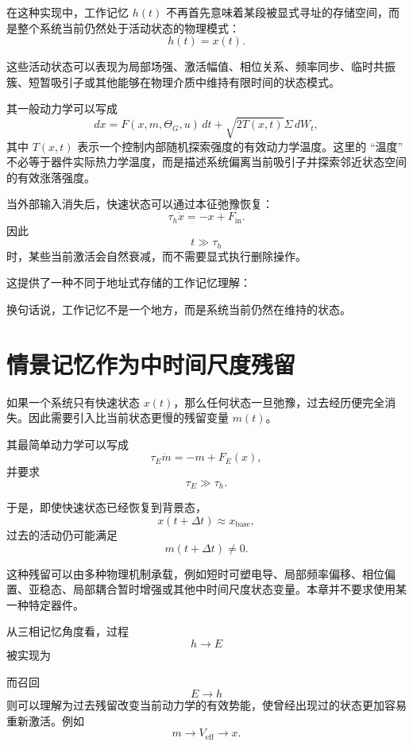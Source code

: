 在这种实现中，工作记忆 $h(t)$ 不再首先意味着某段被显式寻址的存储空间，而是整个系统当前仍然处于活动状态的物理模式：
\[
\boxed{
h(t)=x(t).
}
\]

这些活动状态可以表现为局部场强、激活幅值、相位关系、频率同步、临时共振簇、短暂吸引子或其他能够在物理介质中维持有限时间的状态模式。

其一般动力学可以写成
\[
dx
=
F(x,m,\Theta_G,u)\,dt
+
\sqrt{2T(x,t)}\Sigma\,dW_t,
\]
其中 $T(x,t)$ 表示一个控制内部随机探索强度的有效动力学温度。这里的 ``温度'' 不必等于器件实际热力学温度，而是描述系统偏离当前吸引子并探索邻近状态空间的有效涨落强度。

当外部输入消失后，快速状态可以通过本征弛豫恢复：
\[
\tau_h \dot{x}
=
-x+F_{\mathrm{in}}.
\]
因此
\[
t\gg\tau_h
\]
时，某些当前激活会自然衰减，而不需要显式执行删除操作。

这提供了一种不同于地址式存储的工作记忆理解：
\begin{statementbox}
\centering
{}
\end{statementbox}

换句话说，工作记忆不是一个地方，而是系统当前仍然在维持的状态。

\section{情景记忆作为中时间尺度残留}

如果一个系统只有快速状态 $x(t)$，那么任何状态一旦弛豫，过去经历便完全消失。因此需要引入比当前状态更慢的残留变量 $m(t)$。

其最简单动力学可以写成
\[
\tau_E \dot m
=
-m+
F_E(x),
\]
并要求
\[
\tau_E\gg\tau_h.
\]

于是，即使快速状态已经恢复到背景态，
\[
x(t+\Delta t)\approx x_{\mathrm{base}},
\]
过去的活动仍可能满足
\[
m(t+\Delta t)\neq 0.
\]

这种残留可以由多种物理机制承载，例如短时可塑电导、局部频率偏移、相位偏置、亚稳态、局部耦合暂时增强或其他中时间尺度状态变量。本章并不要求使用某一种特定器件。

从三相记忆角度看，过程
\[
h\rightarrow E
\]
被实现为
\begin{statementbox}
\centering
{}
\end{statementbox}

而召回
\[
E\rightarrow h
\]
则可以理解为过去残留改变当前动力学的有效势能，使曾经出现过的状态更加容易重新激活。例如
\[
m
\rightarrow
V_{\mathrm{eff}}
\rightarrow
x.
\]


